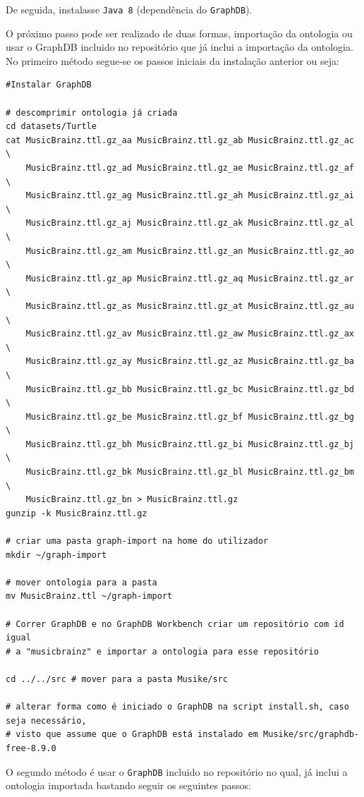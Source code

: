 \documentclass{article}
\begin{document}
De seguida, instalasse \texttt{Java 8} (dependência do \texttt{GraphDB}).

O próximo passo pode ser realizado de duas formas, importação da ontologia ou usar o GraphDB incluido no repositório que já inclui a importação da ontologia. No primeiro método segue-se os passos iniciais da instalação anterior ou seja:

\begin{framed}
\begin{verbatim}
#Instalar GraphDB

# descomprimir ontologia já criada
cd datasets/Turtle
cat MusicBrainz.ttl.gz_aa MusicBrainz.ttl.gz_ab MusicBrainz.ttl.gz_ac \
    MusicBrainz.ttl.gz_ad MusicBrainz.ttl.gz_ae MusicBrainz.ttl.gz_af \
    MusicBrainz.ttl.gz_ag MusicBrainz.ttl.gz_ah MusicBrainz.ttl.gz_ai \
    MusicBrainz.ttl.gz_aj MusicBrainz.ttl.gz_ak MusicBrainz.ttl.gz_al \
    MusicBrainz.ttl.gz_am MusicBrainz.ttl.gz_an MusicBrainz.ttl.gz_ao \
    MusicBrainz.ttl.gz_ap MusicBrainz.ttl.gz_aq MusicBrainz.ttl.gz_ar \
    MusicBrainz.ttl.gz_as MusicBrainz.ttl.gz_at MusicBrainz.ttl.gz_au \
    MusicBrainz.ttl.gz_av MusicBrainz.ttl.gz_aw MusicBrainz.ttl.gz_ax \
    MusicBrainz.ttl.gz_ay MusicBrainz.ttl.gz_az MusicBrainz.ttl.gz_ba \
    MusicBrainz.ttl.gz_bb MusicBrainz.ttl.gz_bc MusicBrainz.ttl.gz_bd \
    MusicBrainz.ttl.gz_be MusicBrainz.ttl.gz_bf MusicBrainz.ttl.gz_bg \
    MusicBrainz.ttl.gz_bh MusicBrainz.ttl.gz_bi MusicBrainz.ttl.gz_bj \
    MusicBrainz.ttl.gz_bk MusicBrainz.ttl.gz_bl MusicBrainz.ttl.gz_bm \
    MusicBrainz.ttl.gz_bn > MusicBrainz.ttl.gz
gunzip -k MusicBrainz.ttl.gz

# criar uma pasta graph-import na home do utilizador
mkdir ~/graph-import

# mover ontologia para a pasta
mv MusicBrainz.ttl ~/graph-import

# Correr GraphDB e no GraphDB Workbench criar um repositório com id igual
# a "musicbrainz" e importar a ontologia para esse repositório

cd ../../src # mover para a pasta Musike/src

# alterar forma como é iniciado o GraphDB na script install.sh, caso seja necessário,
# visto que assume que o GraphDB está instalado em Musike/src/graphdb-free-8.9.0
\end{verbatim}
\end{framed}

O segundo método é usar o \texttt{GraphDB} incluido no repositório no qual, já inclui a ontologia importada bastando seguir os seguintes passos:
\end{document}
